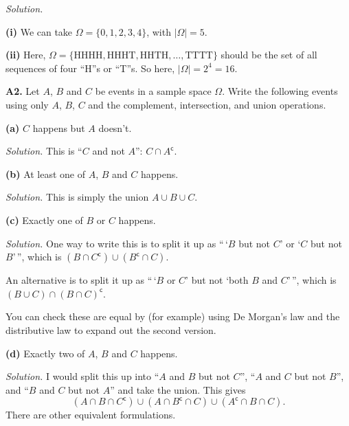 \documentclass[
  a4paper,
]{book}
\theoremstyle{definition}
\theoremstyle{definition}
\theoremstyle{definition}
\theoremstyle{definition}
\theoremstyle{remark}
\begin{document}
\begin{myanswers}
\emph{Solution.}

\textbf{(i)} We can take \(\Omega = \{0,1,2,3,4\}\), with \(|\Omega| = 5\).

\textbf{(ii)} Here, \(\Omega = \{ \text{HHHH}, \text{HHHT}, \text{HHTH},\dots, \text{TTTT} \}\) should be the set of all sequences of four ``H''s or ``T''s. So here, \(|\Omega| = 2^4 = 16\).

\end{myanswers}

\textbf{A2.} Let \(A\), \(B\) and \(C\) be events in a sample space \(\Omega\). Write the following events using only \(A\), \(B\), \(C\) and the complement, intersection, and union operations.

\textbf{(a)} \(C\) happens but \(A\) doesn't.

\begin{myanswers}
\emph{Solution.} This is ``\(C\) and not \(A\)'': \(C\cap A^{\mathsf{c}}\).

\end{myanswers}

\textbf{(b)} At least one of \(A\), \(B\) and \(C\) happens.

\begin{myanswers}
\emph{Solution.} This is simply the union \(A \cup B\cup C\).

\end{myanswers}

\textbf{(c)} Exactly one of \(B\) or \(C\) happens.

\begin{myanswers}
\emph{Solution.} One way to write this is to split it up as ``\,`\(B\) but not \(C\)' or `\(C\) but not \(B\)'\,'', which is \((B \cap C^{\mathsf{c}}) \cup (B^{\mathsf{c}} \cap C)\).

An alternative is to split it up as ``\,`\(B\) or \(C\)' but not `both \(B\) and \(C\)'\,'', which is \((B \cup C) \cap (B\cap C)^{\mathsf{c}}\).

You can check these are equal by (for example) using De Morgan's law and the distributive law to expand out the second version.

\end{myanswers}

\textbf{(d)} Exactly two of \(A\), \(B\) and \(C\) happens.

\begin{myanswers}
\emph{Solution.} I would split this up into ``\(A\) and \(B\) but not \(C\)'', ``\(A\) and \(C\) but not \(B\)'', and ``\(B\) and \(C\) but not \(A\)'' and take the union. This gives
\[  (A \cap B \cap C^{\mathsf{c}}) \cup (A \cap B^{\mathsf{c}} \cap C) \cup (A^{\mathsf{c}} \cap B \cap C) . \]
There are other equivalent formulations.

\end{myanswers}
\end{document}
